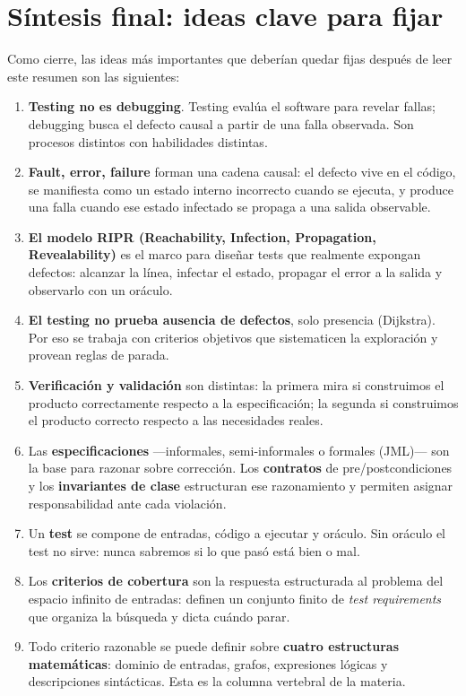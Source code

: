 \documentclass[12pt,a4paper]{article}
\begin{document}
\section{Síntesis final: ideas clave para fijar}
Como cierre, las ideas más importantes que deberían quedar fijas después de leer este resumen son las siguientes:

\begin{enumerate}
  \item \textbf{Testing no es debugging}. Testing evalúa el software para revelar fallas; debugging busca el defecto causal a partir de una falla observada. Son procesos distintos con habilidades distintas.
  \item \textbf{Fault, error, failure} forman una cadena causal: el defecto vive en el código, se manifiesta como un estado interno incorrecto cuando se ejecuta, y produce una falla cuando ese estado infectado se propaga a una salida observable.
  \item \textbf{El modelo RIPR (Reachability, Infection, Propagation, Revealability)} es el marco para diseñar tests que realmente expongan defectos: alcanzar la línea, infectar el estado, propagar el error a la salida y observarlo con un oráculo.
  \item \textbf{El testing no prueba ausencia de defectos}, solo presencia (Dijkstra). Por eso se trabaja con criterios objetivos que sistematicen la exploración y provean reglas de parada.
  \item \textbf{Verificación y validación} son distintas: la primera mira si construimos el producto correctamente respecto a la especificación; la segunda si construimos el producto correcto respecto a las necesidades reales.
  \item Las \textbf{especificaciones} ---informales, semi-informales o formales (JML)--- son la base para razonar sobre corrección. Los \textbf{contratos} de pre/postcondiciones y los \textbf{invariantes de clase} estructuran ese razonamiento y permiten asignar responsabilidad ante cada violación.
  \item Un \textbf{test} se compone de entradas, código a ejecutar y oráculo. Sin oráculo el test no sirve: nunca sabremos si lo que pasó está bien o mal.
  \item Los \textbf{criterios de cobertura} son la respuesta estructurada al problema del espacio infinito de entradas: definen un conjunto finito de \textit{test requirements} que organiza la búsqueda y dicta cuándo parar.
  \item Todo criterio razonable se puede definir sobre \textbf{cuatro estructuras matemáticas}: dominio de entradas, grafos, expresiones lógicas y descripciones sintácticas. Esta es la columna vertebral de la materia.

\end{enumerate}
\end{document}
